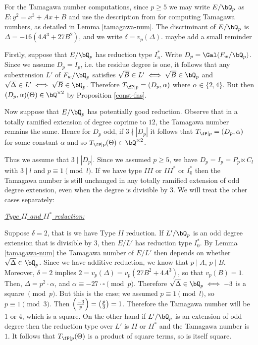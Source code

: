 For the Tamagawa number computations, since $p \geq 5$ we may write $E / \bQ_p$ as $E \colon y^2 = x^3 + A x + B$ and use the description from \cite{reg-const} for computing Tamagawa numbers, as detailed in Lemma \ref{tamagawa-num}. The discriminant of $E / \bQ_p$ is $\Delta = -16(4A^3 + 27 B^2)$, and we write $\delta = v_p(\Delta)$. {\color{red} maybe add a small reminder}

Firstly, suppose that $E / \bQ_p$ has reduction type $I_{n}^{*}$. 
Write $D_p = \Gal(F_w / \bQ_p)$. Since we assume $D_p = I_p$, i.e. the residue degree is one, it follows that any subextension $L'$ of $F_{w} / \bQ_p$ satisfies $\sqrt{B} \in L' \iff \sqrt{B} \in \bQ_p$ and $\sqrt{\Delta} \in L' \iff \sqrt{B} \in \bQ_p$. 
Therefore $T_{\fP \mid p} = (D_p, \alpha)$ where $\alpha \in \{2, 4\}$. But then $(D_p, \alpha)(\Theta) \in \bQ^{\times 2}$ by Proposition \ref{const-fns}.

Now suppose that $E / \bQ_p$ has potentially good reduction. Observe that in a totally ramified extension of degree coprime to $12$, the Tamagawa number remains the same. Hence for $D_p$ odd, if $3 \nmid |D_p|$ it follows that $T_{\fP \mid p} = (D_p, \alpha)$ for some constant $
\alpha$ and so $T_{\fP \mid p}(\Theta) \in \bQ^{\times 2}$.

Thus we assume that $3 \mid |D_p|$. Since we assumed $p \geq 5$, we have $D_p = I_p = P_p \ltimes C_l$ with $3 \mid l$ and $p \equiv 1 \pmod l$. 
If we have type $III$ or $III^*$ or $I_0^*$ then the Tamagawa number is still unchanged in any totally ramified extension of odd degree extension, even when the degree is divisible by $3$. We will treat the other cases separately: 

\vspace{1em}

\noindent\underline{\textit{Type $II$ and $II^*$ reduction:}}

Suppose $\delta = 2$, that is we have Type $II$ reduction. If $L' / \bQ_p$ is an odd degree extension that is divisible by $3$, then $E / L'$ has reduction type $I_0^*$. By Lemma \ref{tamagawa-num} the Tamagawa number of $E / L'$ then depends on whether $\sqrt{\Delta} \in \bQ_p$. Since we have additive reduction, we know that $p \mid A$, $p \mid B$. Moreover, $\delta = 2$ implies $2 = v_p(\Delta) = v_p(27 B^2 + 4A^3)$, so that $v_p(B) = 1$. Then, $\Delta = p^2\cdot \alpha$, and $\alpha \equiv -27\cdot\square \pmod p$. Therefore $\sqrt{\Delta} \in \bQ_p \iff -3$ is a square $\pmod p$. But this is the case; we assumed $p \equiv 1 \pmod l$, so $p \equiv 1 \pmod 3$. Then $\left( \frac{-3}{p} \right)  = \left( \frac{p}{3} \right)  = 1$. Therefore the Tamagawa number will be $1$ or $4$, which is a square.
On the other hand if $L' / \bQ_p$ is an extension of odd degree then the reduction type over $L'$ is $II$ or $II^*$ and the Tamagawa number is $1$. It follows that $T_{\fP \mid p}(\Theta)$ is a product of square terms, so is itself square. 

